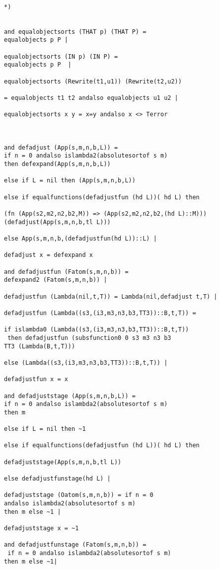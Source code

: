 \documentclass[12pt]{article}
\begin{document}
\begin{verbatim}

*)


and equalobjectsorts (THAT p) (THAT P) =
equalobjects p P |

equalobjectsorts (IN p) (IN P) =
equalobjects p P  |

equalobjectsorts (Rewrite(t1,u1)) (Rewrite(t2,u2))

= equalobjects t1 t2 andalso equalobjects u1 u2 |

equalobjectsorts x y = x=y andalso x <> Terror



and defadjust (App(s,m,n,b,L)) =
if n = 0 andalso islambda2(absolutesortof s m) 
then defexpand(App(s,m,n,b,L))

else if L = nil then (App(s,m,n,b,L))

else if equalfunctions(defadjustfun (hd L))( hd L) then 

(fn (App(s2,m2,n2,b2,M)) => (App(s2,m2,n2,b2,(hd L)::M)))
(defadjust(App(s,m,n,b,tl L)))

else App(s,m,n,b,(defadjustfun(hd L))::L) |

defadjust x = defexpand x

and defadjustfun (Fatom(s,m,n,b)) = 
defexpand2 (Fatom(s,m,n,b)) |

defadjustfun (Lambda(nil,t,T)) = Lambda(nil,defadjust t,T) |

defadjustfun (Lambda((s3,(i3,m3,n3,b3,TT3))::B,t,T)) =

if islambda0 (Lambda((s3,(i3,m3,n3,b3,TT3))::B,t,T))
 then defadjustfun (subsfunction0 0 s3 m3 n3 b3 
TT3 (Lambda(B,t,T)))

else (Lambda((s3,(i3,m3,n3,b3,TT3))::B,t,T)) |

defadjustfun x = x

and defadjuststage (App(s,m,n,b,L)) =
if n = 0 andalso islambda2(absolutesortof s m) 
then m

else if L = nil then ~1

else if equalfunctions(defadjustfun (hd L))( hd L) then 

defadjuststage(App(s,m,n,b,tl L))

else defadjustfunstage(hd L) |

defadjuststage (Oatom(s,m,n,b)) = if n = 0 
andalso islambda2(absolutesortof s m) 
then m else ~1 |

defadjuststage x = ~1

and defadjustfunstage (Fatom(s,m,n,b)) = 
 if n = 0 andalso islambda2(absolutesortof s m) 
then m else ~1|


\end{verbatim}
\end{document}

